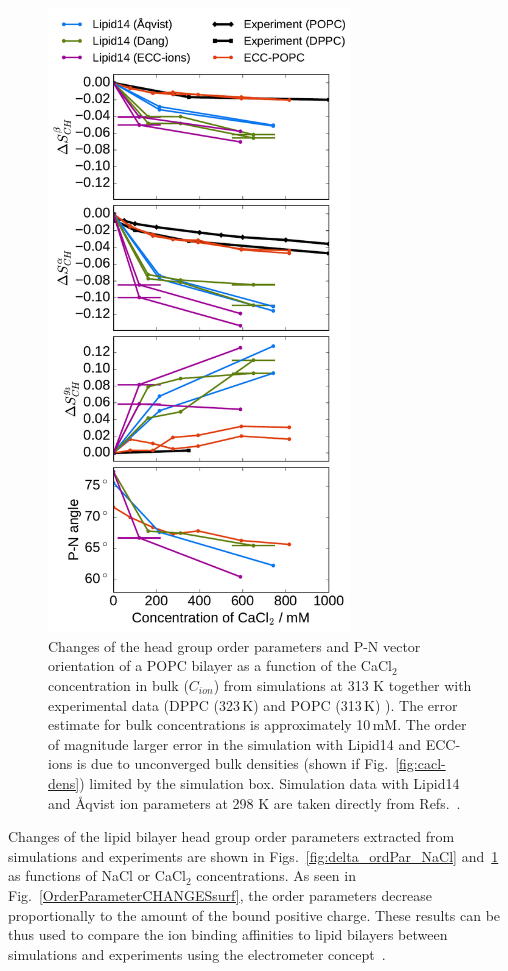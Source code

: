 \begin{figure}[htb!] 
  \centering 
  \includegraphics[width=8.0cm]{../img/ecc_pops/PN_angle_OrdPars-A-B-g3_L14-ECCL17_q80_sig89_CaCl.pdf} 
  \caption{\label{fig:delta_ordPar_CaCl} 
    Changes of the head group order parameters and P-N vector orientation of a POPC bilayer  
    as a function of the CaCl$_2$ concentration in bulk ($C_{ion}$) 
    from simulations at 313 K together with experimental data  
    (DPPC (323\,K) \citep{akutsu81} and POPC (313\,K) \citep{altenbach84}).  
    The error estimate for bulk concentrations is approximately 10\,mM. 
    The order of magnitude larger error in the
    simulation with Lipid14 and ECC-ions is due to unconverged bulk densities  (shown if Fig.~\ref{fig:cacl-dens}) limited by
    the simulation box.  
    Simulation data with Lipid14 and Åqvist ion parameters at 298 K are taken directly from 
    Refs.~\citep{lipid14POPC0mMNaClfiles,lipid14POPC350mMCaClfiles,lipid14POPC350mMCaClfilesNC}. 
  } 
\end{figure} 
 
Changes of the lipid bilayer head group order parameters extracted from simulations and 
experiments \citep{akutsu81, altenbach84} are shown in Figs.~\ref{fig:delta_ordPar_NaCl} 
and~\ref{fig:delta_ordPar_CaCl} as functions of NaCl or CaCl$_2$ concentrations. 
As seen in Fig.~\ref{OrderParameterCHANGESsurf}, the order parameters decrease 
proportionally to the amount of the bound positive charge. 
These results can be thus used to compare the ion binding affinities to lipid bilayers between 
simulations and experiments using the electrometer concept~\citep{seelig87, catte16}. 
 
